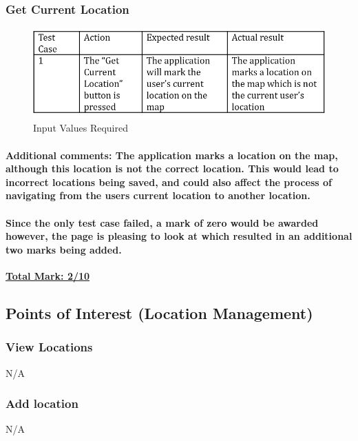 \documentclass[english]{article}
\begin{document}
\subsubsection{Get Current Location}

\begin{figure}[H]
\centering
\includegraphics[width=1.0\textwidth]{7.1}
\caption{Input Values Required}
\end{figure}

\paragraph{Additional comments: \newline The application marks a location on the map, although this location is not the correct location. This would lead to incorrect locations being saved, and could also affect the process of navigating from the users current location to another location. \newline}


\paragraph{Since the only test case failed, a mark of zero would be awarded however, the page is pleasing to look at which resulted in an additional two marks being added. \newline}
\textbf{\underline{Total Mark: 2/10}}




\subsection{Points of Interest (Location Management)}

\subsubsection{View Locations}
N/A
\subsubsection{Add location}
N/A
\end{document}
